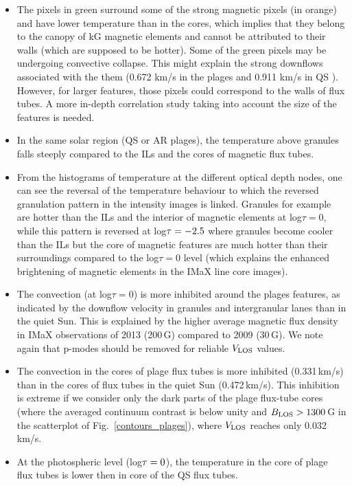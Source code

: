 \documentclass[goettingen, gauss, print]{thesis}
\begin{document}
\begin{itemize}
\item The pixels in green surround some of the strong magnetic pixels (in orange) and have lower temperature than in the cores, which implies that they belong to the canopy of kG magnetic elements and cannot be attributed to their walls (which are supposed to be hotter). Some of the green pixels may be undergoing convective collapse. This might explain the strong downflows associated with the them (0.672 km/s in the plages and 0.911 km/s in QS ). However, for larger features, those pixels could correspond to the walls of flux tubes. A more in-depth correlation study taking into account the size of the features is needed.

\item In the same solar region (QS or AR plages), the temperature above granules falls steeply compared to the ILs and the cores of magnetic flux tubes.
\item From the histograms of temperature at the different optical depth nodes, one can see the reversal of the temperature behaviour to which the reversed granulation pattern in the intensity images is linked. Granules for example are hotter than the ILs and the interior of magnetic elements at log$\tau=0$, while this pattern is reversed at log$\rm \tau=-2.5$ where granules become cooler than the ILs but the core of magnetic features are much hotter than their surroundings compared to the log$\tau=0$ level (which explains the enhanced brightening of magnetic elements in the IMaX line core images).
\item The convection (at log$\tau=0$) is more inhibited around the plages features, as indicated by the downflow velocity in granules and intergranular lanes than in the quiet Sun. This is explained by the higher average magnetic flux density in IMaX observations of 2013 (200\,G) compared to 2009 (30\,G). We note again that p-modes should be removed for reliable $V_{\rm LOS}$ values.
\item The convection in the cores of plage flux tubes is more inhibited (0.331\,km/s) than in the cores of flux tubes in the quiet Sun (0.472\,km/s). This inhibition is extreme if we consider only the dark parts of the plage flux-tube cores (where the averaged continuum contrast is below unity and $B_{\rm LOS}>1300$\,G in the scatterplot of Fig.~\ref{contours_plages}), where $V_{\rm LOS}$ reaches only 0.032 km/s.
\item At the photospheric level (log$\rm \tau=0$), the temperature in the core of plage flux tubes is lower then in core of the QS flux tubes. %

\end{itemize}
\end{document}

